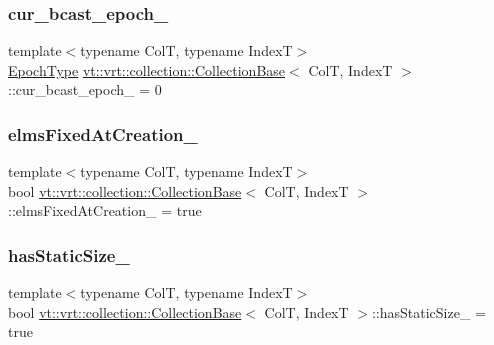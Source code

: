 \subsubsection{\texorpdfstring{cur\+\_\+bcast\+\_\+epoch\+\_\+}{cur\_bcast\_epoch\_}}
{\footnotesize\ttfamily template$<$typename ColT, typename IndexT$>$ \\
\hyperlink{namespacevt_a985a5adf291c34a3ca263b3378388236}{Epoch\+Type} \hyperlink{structvt_1_1vrt_1_1collection_1_1_collection_base}{vt\+::vrt\+::collection\+::\+Collection\+Base}$<$ ColT, IndexT $>$\+::cur\+\_\+bcast\+\_\+epoch\+\_\+ = 0\hspace{0.3cm}{\ttfamily [protected]}}

\mbox{\label{structvt_1_1vrt_1_1collection_1_1_collection_base_a190e044fe11ef42d34d0af49c78e49ca}} 
\subsubsection{\texorpdfstring{elms\+Fixed\+At\+Creation\+\_\+}{elmsFixedAtCreation\_}}
{\footnotesize\ttfamily template$<$typename ColT, typename IndexT$>$ \\
bool \hyperlink{structvt_1_1vrt_1_1collection_1_1_collection_base}{vt\+::vrt\+::collection\+::\+Collection\+Base}$<$ ColT, IndexT $>$\+::elms\+Fixed\+At\+Creation\+\_\+ = true\hspace{0.3cm}{\ttfamily [protected]}}

\mbox{\label{structvt_1_1vrt_1_1collection_1_1_collection_base_a0894dcc0522db61d302b14d9d28bffdf}} 
\subsubsection{\texorpdfstring{has\+Static\+Size\+\_\+}{hasStaticSize\_}}
{\footnotesize\ttfamily template$<$typename ColT, typename IndexT$>$ \\
bool \hyperlink{structvt_1_1vrt_1_1collection_1_1_collection_base}{vt\+::vrt\+::collection\+::\+Collection\+Base}$<$ ColT, IndexT $>$\+::has\+Static\+Size\+\_\+ = true\hspace{0.3cm}{\ttfamily [protected]}}

